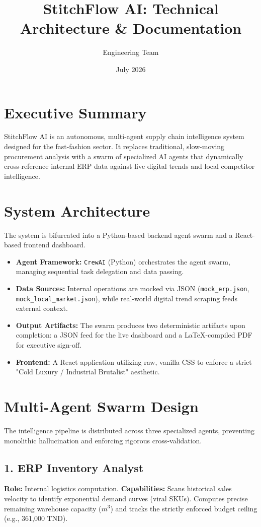 \documentclass{article}
\title{\textbf{StitchFlow AI: Technical Architecture \& Documentation}}
\author{Engineering Team}
\date{July 2026}
\begin{document}
\maketitle

\section{Executive Summary}
StitchFlow AI is an autonomous, multi-agent supply chain intelligence system designed for the fast-fashion sector. It replaces traditional, slow-moving procurement analysis with a swarm of specialized AI agents that dynamically cross-reference internal ERP data against live digital trends and local competitor intelligence. 

\section{System Architecture}
The system is bifurcated into a Python-based backend agent swarm and a React-based frontend dashboard. 

\begin{itemize}
    \item \textbf{Agent Framework:} \texttt{CrewAI} (Python) orchestrates the agent swarm, managing sequential task delegation and data passing.
    \item \textbf{Data Sources:} Internal operations are mocked via JSON (\texttt{mock\_erp.json}, \texttt{mock\_local\_market.json}), while real-world digital trend scraping feeds external context.
    \item \textbf{Output Artifacts:} The swarm produces two deterministic artifacts upon completion: a JSON feed for the live dashboard and a LaTeX-compiled PDF for executive sign-off.
    \item \textbf{Frontend:} A React application utilizing raw, vanilla CSS to enforce a strict "Cold Luxury / Industrial Brutalist" aesthetic. 
\end{itemize}

\section{Multi-Agent Swarm Design}
The intelligence pipeline is distributed across three specialized agents, preventing monolithic hallucination and enforcing rigorous cross-validation.

\subsection{1. ERP Inventory Analyst}
\textbf{Role:} Internal logistics computation.
\textbf{Capabilities:} Scans historical sales velocity to identify exponential demand curves (viral SKUs). Computes precise remaining warehouse capacity ($m^3$) and tracks the strictly enforced budget ceiling (e.g., 361,000 TND).
\end{document}
